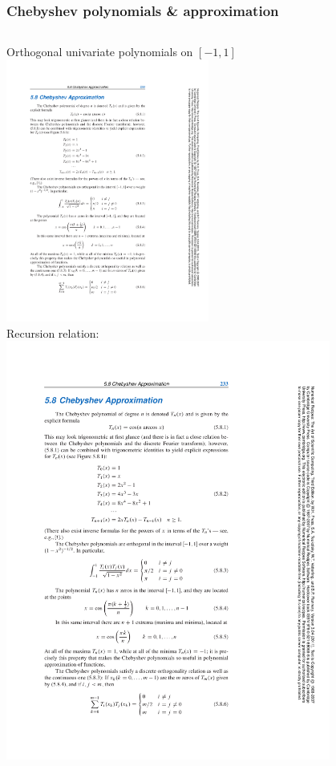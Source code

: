 \documentclass[pdf,ps,8pt]{beamer}
\begin{document}
  \begin{frame}[fragile]\small\frametitle{ Chebyshev polynomials \& approximation}
\tiny
    \begin{columns}
      \begin{column}{0.5\textwidth}
        Orthogonal univariate polynomials on $[-1,1]$\\
        \includegraphics[width=0.5\textwidth]{ChebyCos.pdf}\\
        Recursion relation:\\
        \includegraphics[width=0.8\textwidth]{ChebyRecursion.pdf}\\

\end{column}
\end{columns}
\end{frame}
\end{document}
